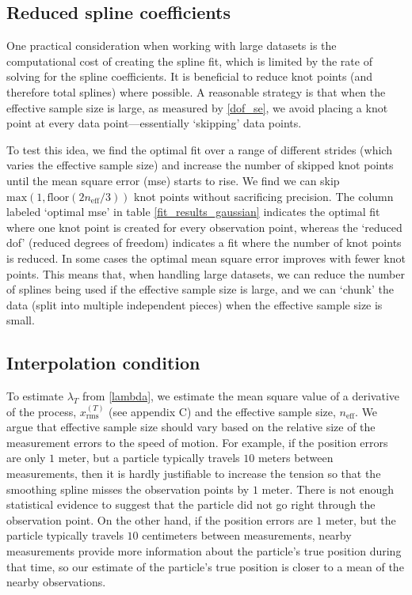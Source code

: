 \documentclass{ametsoc}
\begin{document}
\subsection{Reduced spline coefficients}
\label{subsec:reduced_coefficients}

One practical consideration when working with large datasets is the computational cost of creating the spline fit, which is limited by the rate of solving for the spline coefficients. It is beneficial to reduce knot points (and therefore total splines) where possible. A reasonable strategy is that when the effective sample size is large, as measured by \eqref{dof_se}, we avoid placing a knot point at every data point---essentially `skipping' data points.

To test this idea, we find the optimal fit over a range of different strides (which varies the effective sample size) and increase the number of skipped knot points until the mean square error (mse) starts to rise. We find we can skip $\textrm{max}(1,\textrm{floor}(2n_{\textrm{eff}}/3))$ knot points without sacrificing precision. The column labeled `optimal mse' in table  \ref{fit_results_gaussian} indicates the optimal fit where one knot point is created for every observation point, whereas the `reduced dof' (reduced degrees of freedom) indicates a fit where the number of knot points is reduced. In some cases the optimal mean square error improves with fewer knot points. This means that, when handling large datasets, we can reduce the number of splines being used if the effective sample size is large, and we can `chunk' the data (split into multiple independent pieces) when the effective sample size is small.

\subsection{Interpolation condition}
\label{subsec:interpolation_condition}

To estimate $\lambda_T$ from \eqref{lambda}, we estimate the mean square value of a derivative of the process, $x_{\textrm{rms}}^{(T)}$ (see appendix C) and the effective sample size, $n_{\textrm{eff}}$. We argue that effective sample size should vary based on the relative size of the measurement errors to the speed of motion. For example, if the position errors are only $1$ meter, but a particle typically travels $10$ meters between measurements, then it is hardly justifiable to increase the tension so that the smoothing spline misses the observation points by $1$ meter. There is not enough statistical evidence to suggest that the particle did not go right through the observation point. On the other hand, if the position errors are $1$ meter, but the particle typically travels $10$ centimeters between measurements, nearby measurements provide more information about the particle's true position during that time, so our estimate of the particle's true position is closer to a mean of the nearby observations.
\end{document}
